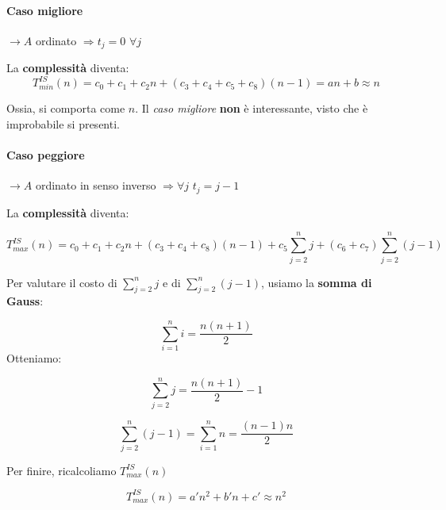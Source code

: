 \paragraph{Caso migliore} \label{is:casomigliore}

$\rightarrow A$ ordinato $\Rightarrow t_j = 0 $ $\forall j$

\bigskip
La \textbf{complessità} diventa:
\begin{displaymath}
    T^{IS}_{min}(n) = c_0 + c_1 + c_2n + (c_3+c_4+c_5+c_8)(n-1) 
    = an+b \approx n
\end{displaymath}

Ossia, si comporta come $n$. Il \emph{caso migliore} \textbf{non}
è interessante, visto che è improbabile si presenti.

\paragraph{Caso peggiore} \label{is:casopeggiore}

$\rightarrow A$ ordinato in senso inverso $\Rightarrow \forall j$ $t_j = j-1$ \par
\bigskip
La \textbf{complessità} diventa: 

\begin{displaymath}
    T^{IS}_{max}(n) = c_0 + c_1 + c_2n + (c_3+c_4+c_8)(n-1)
    + c_5\displaystyle\sum_{j=2}^{n}j + (c_6+c_7)
    \displaystyle\sum_{j=2}^{n}(j-1)
\end{displaymath}

Per valutare il costo di $\displaystyle\sum_{j=2}^{n}j$ e di 
$\displaystyle\sum_{j=2}^{n}(j-1)$, usiamo la \textbf{somma di Gauss}: \par

\begin{equation}
    \displaystyle\sum_{i=1}^{n}i = \frac{n(n+1)}{2}
\end{equation}
\newpage
Otteniamo:

\begin{displaymath}
    \displaystyle\sum_{j=2}^{n}j = \frac{n(n+1)}{2}-1
\end{displaymath}

\begin{displaymath}
    \displaystyle\sum_{j=2}^{n}(j-1) = \displaystyle\sum_{i=1}^{n}n = \frac{(n-1)n}{2}
\end{displaymath}

Per finire, ricalcoliamo $T^{IS}_{max}(n)$

\begin{displaymath}
    T^{IS}_{max}(n) = a'n^2+b'n+c' \approx n^2
\end{displaymath}

